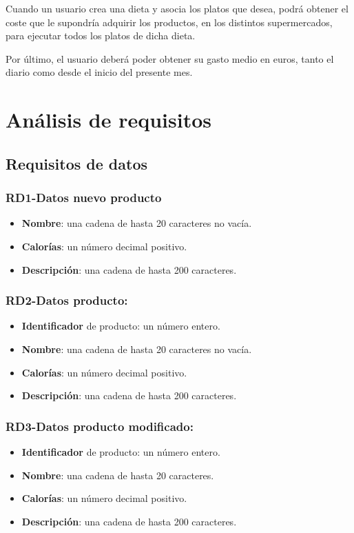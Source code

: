\documentclass[a4paper,12pt]{report}
\begin{document}
Cuando un usuario crea una dieta y asocia los platos que desea,
podrá obtener el coste que le supondría adquirir los productos, en
los distintos supermercados, para ejecutar todos los platos de
dicha dieta.

Por último, el usuario deberá poder obtener su gasto medio en
euros, tanto el diario como desde el inicio del presente mes.
\chapter{Análisis de requisitos}
\label{sec-2}
\section{Requisitos de datos}
\label{sec-2-1}
\subsection{RD1-Datos nuevo producto}
\label{sec-2-1-1}
\begin{itemize}
\item \textbf{Nombre}: una cadena de hasta 20 caracteres no vacía.
\item \textbf{Calorías}: un número decimal positivo.
\item \textbf{Descripción}: una cadena de hasta 200 caracteres.
\end{itemize}

\subsection{RD2-Datos producto:}
\label{sec-2-1-2}
\begin{itemize}
\item \textbf{Identificador} de producto: un número entero.
\item \textbf{Nombre}: una cadena de hasta 20 caracteres no vacía.
\item \textbf{Calorías}: un número decimal positivo.
\item \textbf{Descripción}: una cadena de hasta 200 caracteres.
\end{itemize}
\subsection{RD3-Datos producto modificado:}
\label{sec-2-1-3}
\begin{itemize}
\item \textbf{Identificador} de producto: un número entero.
\item \textbf{Nombre}: una cadena de hasta 20 caracteres.
\item \textbf{Calorías}: un número decimal positivo.
\item \textbf{Descripción}: una cadena de hasta 200 caracteres.
\end{itemize}
\end{document}
